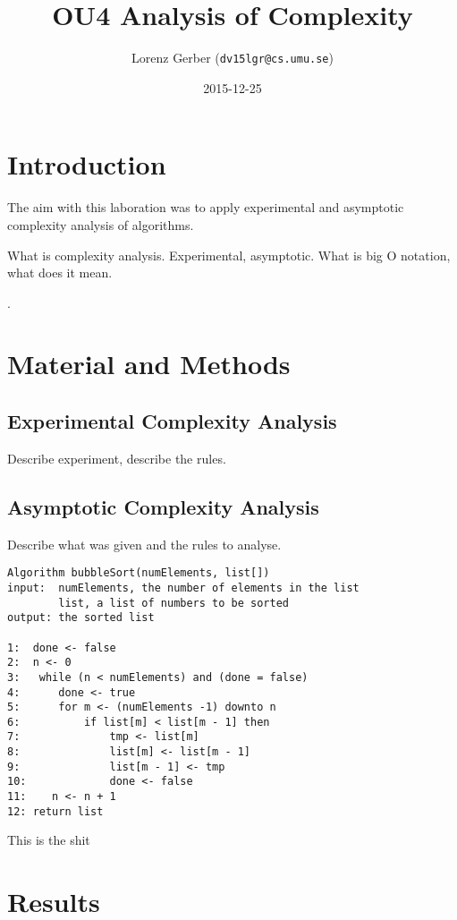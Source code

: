 \documentclass[a4paper,11pt,twoside]{article}
\title{OU4 Analysis of Complexity}
\author{Lorenz Gerber  ({\tt{dv15lgr@cs.umu.se}})}
\date{2015-12-25}
\begin{document}
\lstset{language=C}
\maketitle

\tableofcontents
\newpage

\section{Introduction} 
The aim with this laboration was to apply experimental and asymptotic
complexity analysis of algorithms. 

What is complexity analysis. Experimental, asymptotic. What is big O
notation, what does it mean.
 
\cite[pp. 117 -- 132]{janlert2000}.

\section{Material and Methods}

\subsection{Experimental Complexity Analysis}
Describe experiment, describe the rules.

\subsection{Asymptotic Complexity Analysis}
Describe what was given and the rules to analyse.
\begin{program}
\begin{verbatim}
Algorithm bubbleSort(numElements, list[])
input:  numElements, the number of elements in the list
        list, a list of numbers to be sorted
output: the sorted list

1:  done <- false
2:  n <- 0
3:   while (n < numElements) and (done = false)
4:      done <- true
5:      for m <- (numElements -1) downto n
6:          if list[m] < list[m - 1] then
7:              tmp <- list[m]
8:              list[m] <- list[m - 1]
9:              list[m - 1] <- tmp
10:             done <- false
11:    n <- n + 1
12: return list 
\end{verbatim}
\caption{This is the shit}
\end{program}

\section{Results}
\end{document}
